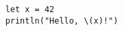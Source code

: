 \documentclass{article}
\begin{document}
\begin{verbatim}
    let x = 42
    println("Hello, \(x)!")
\end{verbatim}
\end{document}
